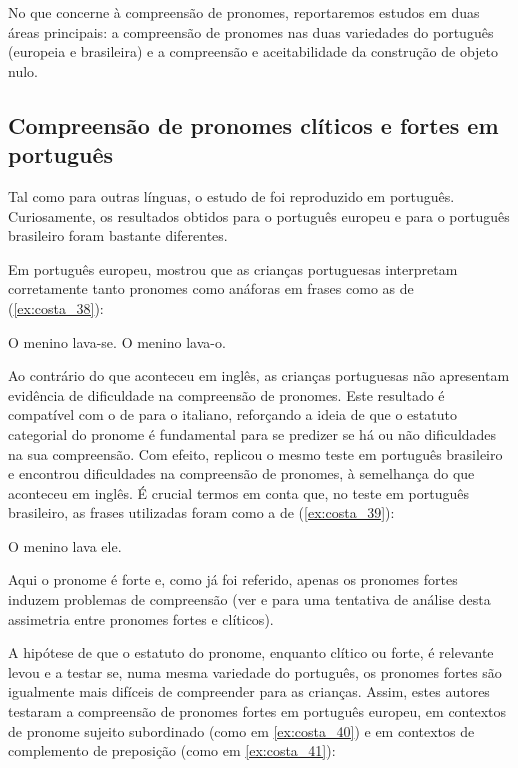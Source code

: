 \documentclass[output=paper]{LSP/langsci}
\begin{document}
No que concerne à compreensão de pronomes, reportaremos estudos em duas áreas principais: a compreensão de pronomes nas duas variedades do português (europeia e brasileira) e a compreensão e aceitabilidade da construção de objeto nulo.

\subsection{Compreensão de pronomes clíticos e fortes em português}
\label{subsec:costa_compreensao_pt}

Tal como para outras línguas, o estudo de \citet{chienwexler1990} foi reproduzido em português. Curiosamente, os resultados obtidos para o português europeu e para o português brasileiro foram bastante diferentes.

Em português europeu, \citet{cristovao2006} mostrou que as crianças portuguesas interpretam corretamente tanto pronomes como anáforas em frases como as de (\ref{ex:costa_38}):

\ea\label{ex:costa_38}
\ea\label{ex:costa_38a} O menino lava-se.
\ex\label{ex:costa_38b} O menino lava-o.
\zl

Ao contrário do que aconteceu em inglês, as crianças portuguesas não apresentam evidência de dificuldade na compreensão de pronomes. Este resultado é compatível com o de \citet{mckee1992} para o italiano, reforçando a ideia de que o estatuto categorial do pronome é fundamental para se predizer se há ou não dificuldades na sua compreensão. Com efeito, \citet{grolla2006,grolla2010} replicou o mesmo teste em português brasileiro e encontrou dificuldades na compreensão de pronomes, à semelhança do que aconteceu em inglês. É crucial termos em conta que, no teste em português brasileiro, as frases utilizadas foram como a de (\ref{ex:costa_39}):

\ea\label{ex:costa_39}
O menino lava ele.
\z

Aqui o pronome é forte e, como já foi referido, apenas os pronomes fortes induzem problemas de compreensão (ver \citealt{cristovao2006} e \citealt{costalobo_etal2012} para uma tentativa de análise desta assimetria entre pronomes fortes e clíticos).

A hipótese de que o estatuto do pronome, enquanto clítico ou forte, é relevante levou \citet{costaambulate2010} e \citet{silva2015} a testar se, numa mesma variedade do português, os pronomes fortes são igualmente mais difíceis de compreender para as crianças. Assim, estes autores testaram a compreensão de pronomes fortes em português europeu, em contextos de pronome sujeito subordinado (como em \ref{ex:costa_40}) e em contextos de complemento de preposição (como em \ref{ex:costa_41}):
\end{document}
